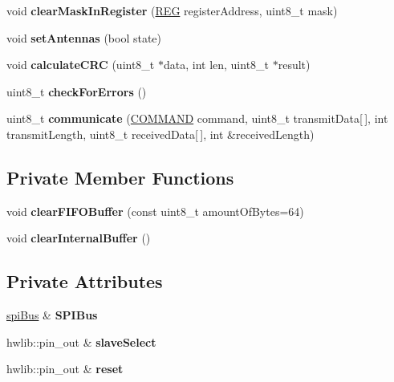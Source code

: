 \begin{DoxyCompactItemize}
void {\bfseries clear\+Mask\+In\+Register} (\mbox{\hyperlink{class_m_f_r_c522_ae7ec09eb8c9c61288a4770175b4b8db7}{R\+EG}} register\+Address, uint8\+\_\+t mask)
\item 
\mbox{\label{class_m_f_r_c522_ad33cc8218440b30747fba97aa59c0583}} 
void {\bfseries set\+Antennas} (bool state)
\item 
\mbox{\label{class_m_f_r_c522_a4df3a992241adac22f7e0464471c3b94}} 
void {\bfseries calculate\+C\+RC} (uint8\+\_\+t $\ast$data, int len, uint8\+\_\+t $\ast$result)
\item 
\mbox{\label{class_m_f_r_c522_a6d831a60a08c5f37a264c61f7c79c372}} 
uint8\+\_\+t {\bfseries check\+For\+Errors} ()
\item 
\mbox{\label{class_m_f_r_c522_ab605cd58a59f1d6cbc48ef0be252e593}} 
uint8\+\_\+t {\bfseries communicate} (\mbox{\hyperlink{class_m_f_r_c522_abf038692c9cf33ed59b44a612e6ed1c7}{C\+O\+M\+M\+A\+ND}} command, uint8\+\_\+t transmit\+Data\mbox{[}$\,$\mbox{]}, int transmit\+Length, uint8\+\_\+t received\+Data\mbox{[}$\,$\mbox{]}, int \&received\+Length)
\end{DoxyCompactItemize}
\subsection*{Private Member Functions}
\begin{DoxyCompactItemize}
\item 
\mbox{\label{class_m_f_r_c522_a0fa1703360d0c741cf915b22e26c2631}} 
void {\bfseries clear\+F\+I\+F\+O\+Buffer} (const uint8\+\_\+t amount\+Of\+Bytes=64)
\item 
\mbox{\label{class_m_f_r_c522_a9d2c5ad7b977944e8bcbbcc9c1bb9b75}} 
void {\bfseries clear\+Internal\+Buffer} ()
\end{DoxyCompactItemize}
\subsection*{Private Attributes}
\begin{DoxyCompactItemize}
\item 
\mbox{\label{class_m_f_r_c522_a76b0186fcad01aafd3d7d7ae4da6a68c}} 
\mbox{\hyperlink{classspi_bus}{spi\+Bus}} \& {\bfseries S\+P\+I\+Bus}
\item 
\mbox{\label{class_m_f_r_c522_ab945c275a8644e226def9f3eee6698a2}} 
hwlib\+::pin\+\_\+out \& {\bfseries slave\+Select}
\item 
\mbox{\label{class_m_f_r_c522_a924c7dced5cb615461a0c9f353076407}} 
hwlib\+::pin\+\_\+out \& {\bfseries reset}
\end{DoxyCompactItemize}


